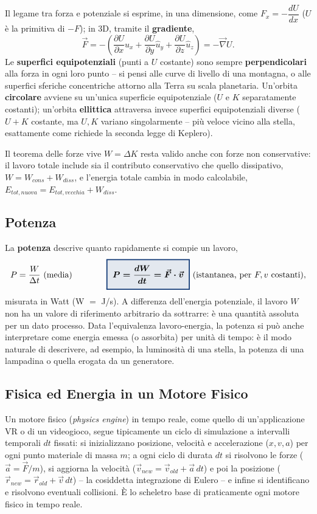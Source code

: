 \documentclass[a4paper,11pt]{article}
\newcommand{\keyeq}[1]{{\setlength{\fboxsep}{6pt}\setlength{\fboxrule}{1.3pt}\fcolorbox{chapblue}{chapblue!12}{\boldmath$\displaystyle #1$}}}
\begin{document}
Il legame tra forza e potenziale si esprime, in una dimensione, come $F_x=-\dfrac{dU}{dx}$ ($U$ è la primitiva di $-F$); in 3D, tramite il \textbf{gradiente},
\[
\vec F = -\left(\frac{\partial U}{\partial x}\hat u_x+\frac{\partial U}{\partial y}\hat u_y+\frac{\partial U}{\partial z}\hat u_z\right) = -\vec\nabla U.
\]
Le \textbf{superfici equipotenziali} (punti a $U$ costante) sono sempre \textbf{perpendicolari} alla forza in ogni loro punto -- si pensi alle curve di livello di una montagna, o alle superfici sferiche concentriche attorno alla Terra su scala planetaria. Un'orbita \textbf{circolare} avviene su un'unica superficie equipotenziale ($U$ e $K$ separatamente costanti); un'orbita \textbf{ellittica} attraversa invece superfici equipotenziali diverse ($U+K$ costante, ma $U,K$ variano singolarmente -- più veloce vicino alla stella, esattamente come richiede la seconda legge di Keplero).

Il teorema delle forze vive $W=\Delta K$ resta valido anche con forze non conservative: il lavoro totale include sia il contributo conservativo che quello dissipativo, $W=W_{cons}+W_{diss}$, e l'energia totale cambia in modo calcolabile, $E_{tot,nuova}=E_{tot,vecchia}+W_{diss}$.

\subsection{Potenza}

La \textbf{potenza} descrive quanto rapidamente si compie un lavoro,
\[
P = \frac{W}{\Delta t}\ \text{(media)} \qquad\qquad \keyeq{P = \frac{dW}{dt} = \vec F\cdot\vec v}\ \text{(istantanea, per } F,v \text{ costanti)},
\]
misurata in Watt (W $=$ J/s). A differenza dell'energia potenziale, il lavoro $W$ non ha un valore di riferimento arbitrario da sottrarre: è una quantità assoluta per un dato processo. Data l'equivalenza lavoro-energia, la potenza si può anche interpretare come energia emessa (o assorbita) per unità di tempo: è il modo naturale di descrivere, ad esempio, la luminosità di una stella, la potenza di una lampadina o quella erogata da un generatore.

\subsection{Fisica ed Energia in un Motore Fisico}

Un motore fisico (\emph{physics engine}) in tempo reale, come quello di un'applicazione VR o di un videogioco, segue tipicamente un ciclo di simulazione a intervalli temporali $dt$ fissati: si inizializzano posizione, velocità e accelerazione ($x,v,a$) per ogni punto materiale di massa $m$; a ogni ciclo di durata $dt$ si risolvono le forze ($\vec a=\vec F/m$), si aggiorna la velocità ($\vec v_{new}=\vec v_{old}+\vec a\,dt$) e poi la posizione ($\vec r_{new}=\vec r_{old}+\vec v\,dt$) -- la cosiddetta integrazione di Eulero -- e infine si identificano e risolvono eventuali collisioni. È lo scheletro base di praticamente ogni motore fisico in tempo reale.
\end{document}

